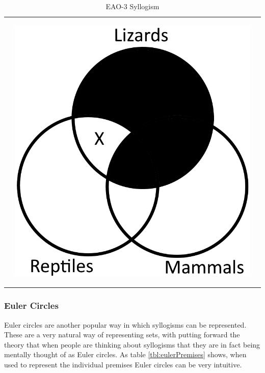 \documentclass[12pt,a4paper]{report}
\begin{document}
\begin{table}[htb]
\begin{tabular}{>{\raggedright\arraybackslash}m{40mm} m{40mm} m{40mm}}
\begin{minipage}{.29\textwidth}
    \end{minipage}
    & 
    \begin{minipage}{.29\textwidth}
    \begin{center}
     \includegraphics[scale=0.25]{VennSomeReptilesAreNotMammals}
    \end{center}
  
    \end{minipage}
    \\
  \end{tabular}
  \caption{EAO-3 Syllogism}\label{tbl:vennEAO-3}
\end{table}
\FloatBarrier



\subsubsection{Euler Circles}
Euler circles are another popular way in which syllogisms can be represented. 
These are a very natural way of representing sets, with \cite{Erickson1978-ERIROS} putting forward the theory that when people are thinking about syllogisms that they are in fact being mentally thought of as Euler circles. As table \ref{tbl:eulerPremises} shows, when used to represent the individual premises Euler circles can be very intuitive.
\end{document}
